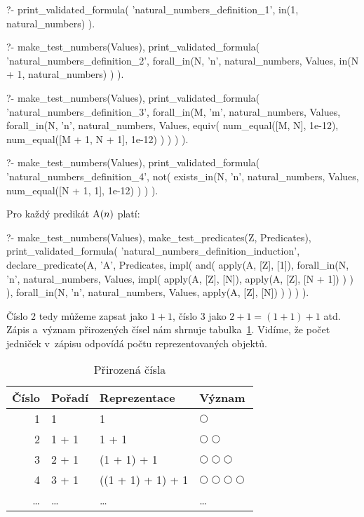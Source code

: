 \begin{fact}
\begin{prolog}
?-	print_validated_formula(
		'natural_numbers_definition_1',
		in(1, natural_numbers)
	).
\end{prolog}
\begin{prolog}
?-	make_test_numbers(Values),
	print_validated_formula(
		'natural_numbers_definition_2',
		forall_in(N, 'n', natural_numbers, Values,
				in(N + 1, natural_numbers)
		)
	).
\end{prolog}
\begin{prolog}
?-	make_test_numbers(Values),
	print_validated_formula(
		'natural_numbers_definition_3',
		forall_in(M, 'm', natural_numbers, Values,
			forall_in(N, 'n', natural_numbers, Values,
				equiv(
					num_equal([M, N], 1e-12),				
					num_equal([M + 1, N + 1], 1e-12)
				)
			)
		)
	).
\end{prolog}
\begin{prolog}
?-	make_test_numbers(Values),
	print_validated_formula(
		'natural_numbers_definition_4',
		not(
			exists_in(N, 'n', natural_numbers, Values,
				num_equal([N + 1, 1], 1e-12)
			)
		)
	).
\end{prolog}
Pro každý predikát \(\mathrm{A}(n)\) platí:
\begin{prolog}
?-	make_test_numbers(Values),
	make_test_predicates(Z, Predicates),
	print_validated_formula(
		'natural_numbers_definition_induction',
		declare_predicate(A, 'A', Predicates,
			impl(			
				and(
					apply(A, [Z], [1]),
					forall_in(N, 'n', natural_numbers, Values,
						impl(
							apply(A, [Z], [N]),
							apply(A, [Z], [N + 1])
						)
					)
				),
				forall_in(N, 'n', natural_numbers, Values,
					apply(A, [Z], [N])
				)
			)
		)
	).
\end{prolog}
\end{fact}

Číslo 2 tedy můžeme zapsat jako \(1 + 1\), číslo 3 jako \(2 + 1 = (1 + 1) + 1\) atd. Zápis a~význam přirozených čísel nám shrnuje tabulka~\ref{tab:natural_numbers}. Vidíme, že počet jedniček v~zápisu odpovídá počtu reprezentovaných objektů.

\begin{table}[ht]
\centering
\begin{tabular}{|r|l|l|l|}
\hline
Číslo & Pořadí & Reprezentace & Význam \\
\hline
1 & 1 & 1 & \(\bigcirc\) \\
2 & 1 + 1 & 1 + 1 & \(\bigcirc \bigcirc\) \\
3 & 2 + 1 & (1 + 1) + 1 & \(\bigcirc \bigcirc \bigcirc\) \\
4 & 3 + 1 & ((1 + 1) + 1) + 1 & \(\bigcirc \bigcirc \bigcirc \bigcirc\) \\
\ldots & \ldots & \ldots & \ldots \\
\hline
\end{tabular}
\caption{Přirozená čísla}
\label{tab:natural_numbers}
\end{table}


